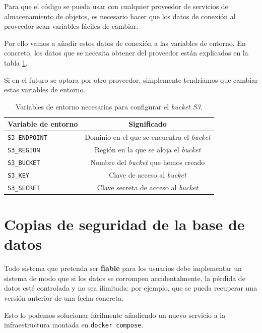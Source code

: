 Para que el código se pueda usar con cualquier proveedor de servicios de almacenamiento de objetos, es necesario hacer que los datos de conexión al proveedor sean variables fáciles de cambiar.

Por ello vamos a añadir estos datos de conexión a las variables de entorno. En concreto, los datos que se necesita obtener del proveedor están explicados en la tabla \ref{tab:envS3}.

Si en el futuro se optara por otro proveedor, simplemente tendríamos que cambiar estas variables de entorno.

\begin{table}[]
    \centering
    \begin{tabular}{|l|c|}
        \hline
        \textbf{Variable de entorno} & \textbf{Significado} \\
        \hline
        \texttt{S3\_ENDPOINT} & Dominio en el que se encuentra el \textit{bucket} \\
        \hline
        \texttt{S3\_REGION} & Región en la que se aloja el \textit{bucket} \\
        \hline
        \texttt{S3\_BUCKET} & Nombre del \textit{bucket} que hemos creado \\
        \hline
        \texttt{S3\_KEY} & Clave de acceso al \textit{bucket} \\
        \hline
        \texttt{S3\_SECRET} & Clave secreta de acceso al \textit{bucket} \\
        \hline
    \end{tabular}
    \caption{Variables de entorno necesarias para configurar el \textit{bucket S3}.}
    \label{tab:envS3}
\end{table}


\section{Copias de seguridad de la base de datos}


Todo sistema que pretenda ser \textbf{fiable} para los usuarios debe implementar un sistema de modo que si los datos se corrompen accidentalmente, la pérdida de datos esté controlada y no sea ilimitada: por ejemplo, que se pueda recuperar una versión anterior de una fecha concreta.

Esto lo podemos solucionar fácilmente añadiendo un nuevo servicio a la infraestructura montada en \texttt{docker compose}.

